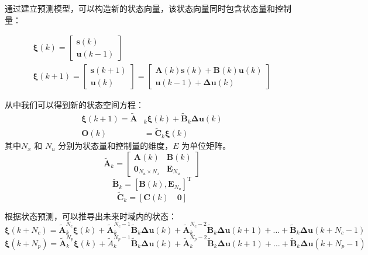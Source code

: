 \documentclass[lang=chs, degree=master, blindreview=false, winfonts=true]{yanputhesis}
\begin{document}
通过建立预测模型，可以构造新的状态向量，该状态向量同时包含状态量和控制量：


\begin{equation}
	\begin{gathered}\bm \xi(k)=\begin{bmatrix}\bm s(k)\\\bm u(k-1)\end{bmatrix}\\\bm \xi(k+1)=\begin{bmatrix}\bm s(k+1)\\\bm u(k)\end{bmatrix}=\begin{bmatrix}\bm A(k)\bm s(k)+\bm B(k)\bm u(k)\\\bm u(k-1)+\bm \Delta \bm u(k)\end{bmatrix}\end{gathered}
\end{equation}

从中我们可以得到新的状态空间方程：
\begin{equation}
	\begin{aligned}\bm \xi(k+1)=\tilde{\bm A}&_k\bm \xi(k)+\tilde{\bm B}_k\bm \Delta \bm u(k)\\\bm O(k)&=\tilde{\bm C}_k\bm\xi(k)\end{aligned}
	\label{3-11}
\end{equation}
其中$N_x$ 和 $N_u$ 分别为状态量和控制量的维度，$E$ 为单位矩阵。
$$\bm{\tilde{A}}_k = \begin{bmatrix} \bm A(k) & \bm B(k) \\ \bm 0_{N_u \times N_x} & \bm E_{N_u} \end{bmatrix}$$$$\tilde{\bm B}_k = \left[ \bm B(k) , \bm E_{N_u} \right]^\mathrm{T}$$$$\tilde{\bm C}_k = \left[ \bm C(k) \quad \bm 0 \right]$$

根据状态预测，可以推导出未来时域内的状态：
\begin{equation}
    \bm \xi(k + N_c) = \tilde{\bm A}_k^{N_c} \bm \xi(k) + \tilde{\bm A}_k^{N_c-1} \tilde{\bm B}_k \bm \Delta \bm u(k) + \tilde{\bm A}_k^{N_c-2} \bm \tilde{\bm B}_k \bm \Delta \bm u(k+1) + \dots + \tilde{\bm B}_k \bm \Delta \bm u(k + N_c - 1)
\end{equation}
\begin{equation}
    \bm \xi(k + N_p) = \tilde{\bm A}_k^{N_p} \bm \xi(k) + \tilde{A}_k^{N_p-1} \tilde{\bm B}_k \bm \Delta \bm u(k) + \tilde{\bm A}_k^{N_p-2} \tilde{\bm B}_k \bm \Delta \bm u(k+1) + \dots + \tilde{\bm B}_k \bm \Delta \bm u(k + N_p - 1)
\end{equation}
\end{document}
